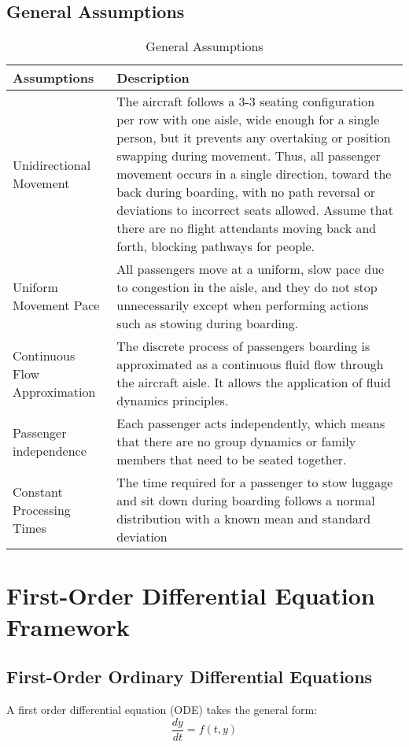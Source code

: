\documentclass[12pt]{article}
\begin{document}
\subsection{General Assumptions}

\begin{table}[H]
\centering
\caption{General Assumptions}
\begin{tabular}{p{3cm}p{12cm}}
\toprule
\textbf{Assumptions} & \textbf{Description} \\
\midrule
Unidirectional Movement & The aircraft follows a 3-3 seating configuration per row with one aisle, wide enough for a single person, but it prevents any overtaking or position swapping during movement. Thus, all passenger movement occurs in a single direction, toward the back during boarding, with no path reversal or deviations to incorrect seats allowed. Assume that there are no flight attendants moving back and forth, blocking pathways for people. \\
\midrule
Uniform Movement Pace & All passengers move at a uniform, slow pace due to congestion in the aisle, and they do not stop unnecessarily except when performing actions such as stowing during boarding. \\
\midrule
Continuous Flow Approximation & The discrete process of passengers boarding is approximated as a continuous fluid flow through the aircraft aisle. It allows the application of fluid dynamics principles. \\
\midrule
Passenger independence & Each passenger acts independently, which means that there are no group dynamics or family members that need to be seated together. \\
\midrule
Constant Processing Times & The time required for a passenger to stow luggage and sit down during boarding follows a normal distribution with a known mean and standard deviation \\
\bottomrule
\end{tabular}
\end{table}

\section{First-Order Differential Equation Framework}
\subsection{First-Order Ordinary Differential Equations}

A first order differential equation (ODE) takes the general form:
\begin{equation}
\frac{dy}{dt} = f(t, y)
\end{equation}
\end{document}
